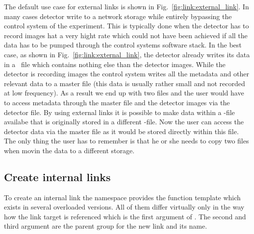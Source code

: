 The default use case for external links is shown in
Fig.~\ref{fig:link:external_link}. In many cases detector write to a network
storage while entirely bypassing the control system of the experiment. This is
typically done when the detector has to record images hat a very hight rate
which could not have been achieved if all the data has to be pumped through the
control systems software stack. 
In the best case, as shown in Fig.~\ref{fig:link:external_link}, the detector
already writes its data in a \nexus\ file which contains nothing else than the
detector images. While the detector is recording images the control system
writes all the metadata and other relevant data to a master file (this data is
usually rather small and not recorded at low frequency). As a result we end up
with two files and the user would have to access metadata through the master
file and the detector images via the detector file. By using external links 
it is possible to make data within a \nexus-file availabe that is originally
stored in a different \nexus-file. Now the user can access the detector data via
the master file as it would be stored directly within this file.
The only thing the user has to remember is that he or she needs to copy two
files when movin the data to a different storage.

\subsection{Create internal links}

To create an internal link the  namespace provides the
 function template which exists in several overloaded versions.
All of them differ virtually only in the way how the link target is referenced
which is the first argument of . The second and third argument are
the parent group for the new link and its name.

